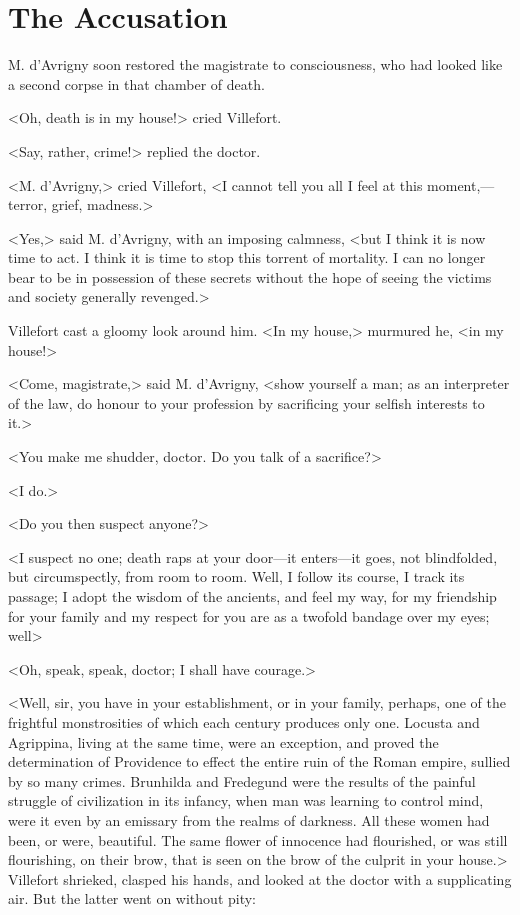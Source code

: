 \chapter{The Accusation} 
	
	\lettrine{M}{.} d'Avrigny soon restored the magistrate to consciousness, who had looked like a second corpse in that chamber of death. 

\zz
 <Oh, death is in my house!> cried Villefort. 

\zz
 <Say, rather, crime!> replied the doctor. 

 <M. d'Avrigny,> cried Villefort, <I cannot tell you all I feel at this moment,—terror, grief, madness.> 

 <Yes,> said M. d'Avrigny, with an imposing calmness, <but I think it is now time to act. I think it is time to stop this torrent of mortality. I can no longer bear to be in possession of these secrets without the hope of seeing the victims and society generally revenged.> 

 Villefort cast a gloomy look around him. <In my house,> murmured he, <in my house!> 

 <Come, magistrate,> said M. d'Avrigny, <show yourself a man; as an interpreter of the law, do honour to your profession by sacrificing your selfish interests to it.> 

 <You make me shudder, doctor. Do you talk of a sacrifice?> 

 <I do.> 

 <Do you then suspect anyone?> 

 <I suspect no one; death raps at your door—it enters—it goes, not blindfolded, but circumspectly, from room to room. Well, I follow its course, I track its passage; I adopt the wisdom of the ancients, and feel my way, for my friendship for your family and my respect for you are as a twofold bandage over my eyes; well\longdash> 

 <Oh, speak, speak, doctor; I shall have courage.> 

 <Well, sir, you have in your establishment, or in your family, perhaps, one of the frightful monstrosities of which each century produces only one. Locusta and Agrippina, living at the same time, were an exception, and proved the determination of Providence to effect the entire ruin of the Roman empire, sullied by so many crimes. Brunhilda and Fredegund were the results of the painful struggle of civilization in its infancy, when man was learning to control mind, were it even by an emissary from the realms of darkness. All these women had been, or were, beautiful. The same flower of innocence had flourished, or was still flourishing, on their brow, that is seen on the brow of the culprit in your house.>  Villefort shrieked, clasped his hands, and looked at the doctor with a supplicating air. But the latter went on without pity: 

